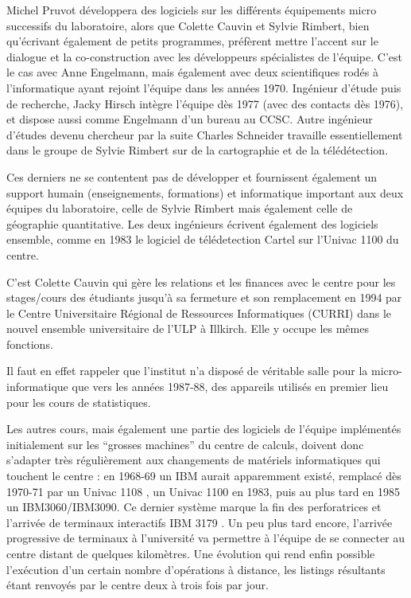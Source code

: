 Michel Pruvot développera des logiciels sur les différents équipements micro successifs du laboratoire, alors que Colette Cauvin et Sylvie Rimbert, bien qu'écrivant également de petits programmes, préfèrent mettre l'accent sur le dialogue et la co-construction avec les développeurs spécialistes de l'équipe. C'est le cas avec Anne Engelmann, mais également avec deux scientifiques rodés à l'informatique ayant rejoint l'équipe dans les années 1970. Ingénieur d'étude puis de recherche, Jacky Hirsch intègre l'équipe dès 1977 (avec des contacts dès 1976), et dispose aussi comme Engelmann d'un bureau au CCSC. Autre ingénieur d'études devenu chercheur par la suite Charles Schneider travaille essentiellement dans le groupe de Sylvie Rimbert sur de la cartographie et de la télédétection.

Ces derniers ne se contentent pas de développer et fournissent également un support humain (enseignements, formations) et informatique important aux deux équipes du laboratoire, celle de Sylvie Rimbert mais également celle de géographie quantitative. Les deux ingénieurs écrivent également des logiciels ensemble, comme en 1983 le logiciel de télédetection Cartel sur l'Univac 1100 du centre.

C'est Colette Cauvin qui gère les relations et les finances avec le centre pour les stages/cours des étudiants jusqu'à sa fermeture et son remplacement en 1994 par le Centre Universitaire Régional de Ressources Informatiques (CURRI) dans le nouvel ensemble universitaire de l'ULP à Illkirch. Elle y occupe les mêmes fonctions.

Il faut en effet rappeler que l'institut n'a disposé de véritable salle pour la micro-informatique que vers les années 1987-88, des appareils utilisés en premier lieu pour les cours de statistiques.

Les autres cours, mais également une partie des logiciels de l'équipe implémentés initialement sur les \enquote{grosses machines} du centre de calculs, doivent donc s'adapter très régulièrement aux changements de matériels informatiques qui touchent le centre : en 1968-69 un IBM aurait apparemment existé, remplacé dès 1970-71 par un Univac 1108 \autocite{Dalmasso1971}, un Univac 1100 en 1983, puis au plus tard en 1985 un IBM3060/IBM3090. Ce dernier système marque la fin des perforatrices et l'arrivée de terminaux interactifs IBM 3179 \autocites{Rimbert1984,Cauvin1986}. Un peu plus tard encore, l'arrivée progressive de terminaux à l'université va permettre à l'équipe de se connecter au centre distant de quelques kilomètres. Une évolution qui rend enfin possible l'exécution d'un certain nombre d'opérations à distance, les listings résultants étant renvoyés par le centre deux à trois fois par jour.

